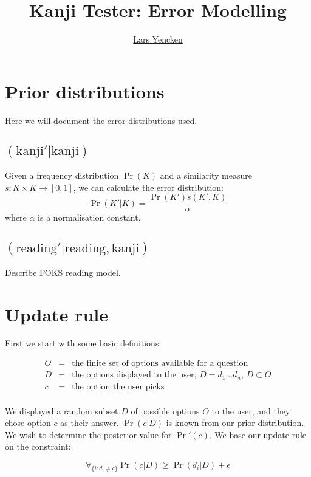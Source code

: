 \documentclass[11pt,a4paper]{article}
\title{{\fontspec{ACaslonPro-Bold} Kanji Tester: Error Modelling}}
\author{\href{mailto:lljy@csse.unimelb.edu.au}{Lars Yencken}}
\begin{document}
\maketitle

\section*{Prior distributions}

Here we will document the error distributions used.

\subsection*{$(\text{kanji}' | \text{kanji})$}

Given a frequency distribution $\Pr(K)$ and a similarity measure $s: K \times
K \rightarrow [0, 1]$, we can calculate the error distribution:
\[
\Pr(K'|K) = \frac{\Pr(K')s(K', K)}{\alpha}
\]
where $\alpha$ is a normalisation constant.

\subsection*{$(\text{reading}' | \text{reading}, \text{kanji})$}

Describe FOKS reading model.

\section*{Update rule}

First we start with some basic definitions:

\begin{eqnarray*}
O & = & \text{the finite set of options available for a question}\\
D & = & \text{the options displayed to the user, $D = d_1 \dots d_n$,
    $D \subset O$}\\
c & = & \text{the option the user picks}\\
\end{eqnarray*}

We displayed a random subset $D$ of possible options $O$ to the user, and they
chose option $c$ as their answer. $\Pr(c|D)$ is known from our prior
distribution. We wish to determine the posterior value for $\Pr'(c)$.
We base our update rule on the constraint:

\[
\forall_{\{i:d_i \ne c\}} \Pr(c|D) \ge \Pr(d_i|D) + \epsilon
\]
\end{document}
